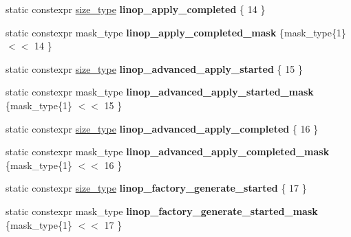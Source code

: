 \begin{DoxyCompactItemize}
\item 
\mbox{\label{classgko_1_1log_1_1Logger_a461e4699939b89bf1d68bec89fb831b6}} 
static constexpr \hyperlink{namespacegko_a6e5c95df0ae4e47aab2f604a22d98ee7}{size\+\_\+type} {\bfseries linop\+\_\+apply\+\_\+completed} \{ 14 \}
\item 
\mbox{\label{classgko_1_1log_1_1Logger_ad9b86a561beaea21b4ff01e09a87fff5}} 
static constexpr mask\+\_\+type {\bfseries linop\+\_\+apply\+\_\+completed\+\_\+mask} \{mask\+\_\+type\{1\} $<$$<$ 14 \}
\item 
\mbox{\label{classgko_1_1log_1_1Logger_a2aecbb96ba2d7747b6d426fea5824e16}} 
static constexpr \hyperlink{namespacegko_a6e5c95df0ae4e47aab2f604a22d98ee7}{size\+\_\+type} {\bfseries linop\+\_\+advanced\+\_\+apply\+\_\+started} \{ 15 \}
\item 
\mbox{\label{classgko_1_1log_1_1Logger_a3fd9e0171275c3039ebc6d87528a71c9}} 
static constexpr mask\+\_\+type {\bfseries linop\+\_\+advanced\+\_\+apply\+\_\+started\+\_\+mask} \{mask\+\_\+type\{1\} $<$$<$ 15 \}
\item 
\mbox{\label{classgko_1_1log_1_1Logger_a180ee07058da5bd5fc3f6460eaafd675}} 
static constexpr \hyperlink{namespacegko_a6e5c95df0ae4e47aab2f604a22d98ee7}{size\+\_\+type} {\bfseries linop\+\_\+advanced\+\_\+apply\+\_\+completed} \{ 16 \}
\item 
\mbox{\label{classgko_1_1log_1_1Logger_ae7a4b7ce2f0dbd5ecf111bee5aafb914}} 
static constexpr mask\+\_\+type {\bfseries linop\+\_\+advanced\+\_\+apply\+\_\+completed\+\_\+mask} \{mask\+\_\+type\{1\} $<$$<$ 16 \}
\item 
\mbox{\label{classgko_1_1log_1_1Logger_a1f7e01009f999cff8bdb8217ed40c6a3}} 
static constexpr \hyperlink{namespacegko_a6e5c95df0ae4e47aab2f604a22d98ee7}{size\+\_\+type} {\bfseries linop\+\_\+factory\+\_\+generate\+\_\+started} \{ 17 \}
\item 
\mbox{\label{classgko_1_1log_1_1Logger_a8a30b4cbb04a9e67efc0829e089fb292}} 
static constexpr mask\+\_\+type {\bfseries linop\+\_\+factory\+\_\+generate\+\_\+started\+\_\+mask} \{mask\+\_\+type\{1\} $<$$<$ 17 \}

\end{DoxyCompactItemize}
